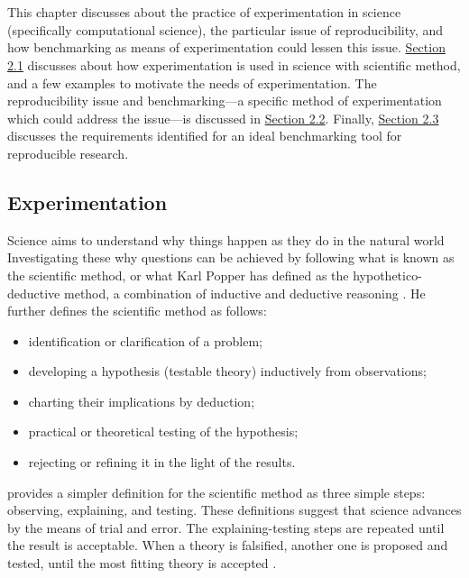 \chapter{\babDua}

This chapter discusses about the practice of experimentation in science (specifically computational science), the particular issue of reproducibility, and how benchmarking as means of experimentation could lessen this issue.
\hyperref[sec:experimentation]{Section 2.1} discusses about how experimentation is used in science with scientific method, and a few examples to motivate the needs of experimentation.
The reproducibility issue and benchmarking---a specific method of experimentation which could address the issue---is discussed in \hyperref[sec:reproducibleBenchmarks]{Section 2.2}.
Finally, \hyperref[sec:idealBenchmarkingTool]{Section 2.3} discusses the requirements identified for an ideal benchmarking tool for reproducible research.

\section{Experimentation}
\label{sec:experimentation}

Science aims to understand why things happen as they do in the natural world \citep{careyBeginnerGuideScientific2012}
Investigating these why questions can be achieved by following what is known as the scientific method, or what Karl Popper has defined as the hypothetico-deductive method, a combination of inductive and deductive reasoning \citep{wallimanResearchMethodsBasics2010a}.
He further defines the scientific method as follows:
\begin{itemize}[noitemsep]
	\item identification or clarification of a problem;
	\item developing a hypothesis (testable theory) inductively from observations;
	\item charting their implications by deduction;
	\item practical or theoretical testing of the hypothesis;
	\item rejecting or refining it in the light of the results.
\end{itemize}

\citet{careyBeginnerGuideScientific2012} provides a simpler definition for the scientific method as three simple steps: observing, explaining, and testing.
These definitions suggest that science advances by the means of trial and error.
The explaining-testing steps are repeated until the result is acceptable.
When a theory is falsified, another one is proposed and tested, until the most fitting theory is accepted \citep{wallimanResearchMethodsBasics2010a}.

